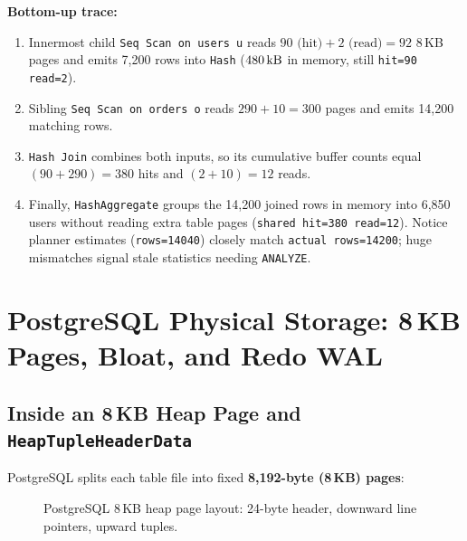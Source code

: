 \textbf{Bottom-up trace:}
\begin{enumerate}[leftmargin=15pt]
  \item Innermost child \texttt{Seq Scan on users u} reads $90\text{ (hit)} + 2\text{ (read)} = 92$ 8\,KB pages and emits 7,200 rows into \texttt{Hash} ($480\text{\,kB}$ in memory, still \texttt{hit=90 read=2}).
  \item Sibling \texttt{Seq Scan on orders o} reads $290 + 10 = 300$ pages and emits 14,200 matching rows.
  \item \texttt{Hash Join} combines both inputs, so its cumulative buffer counts equal $(90+290)=380$ hits and $(2+10)=12$ reads.
  \item Finally, \texttt{HashAggregate} groups the 14,200 joined rows in memory into 6,850 users without reading extra table pages (\texttt{shared hit=380 read=12}). Notice planner estimates (\texttt{rows=14040}) closely match \texttt{actual rows=14200}; huge mismatches signal stale statistics needing \texttt{ANALYZE}.
\end{enumerate}

\section{PostgreSQL Physical Storage: 8\,KB Pages, Bloat, and Redo WAL}

\subsection{Inside an 8\,KB Heap Page and \texttt{HeapTupleHeaderData}}

PostgreSQL splits each table file into fixed \textbf{8,192-byte (8\,KB) pages}:

\begin{figure}[htbp]
\centering
{}
\caption{PostgreSQL 8\,KB heap page layout: 24-byte header, downward line pointers, upward tuples.}
\label{fig:v1-ch05-postgres-page}
\end{figure}

